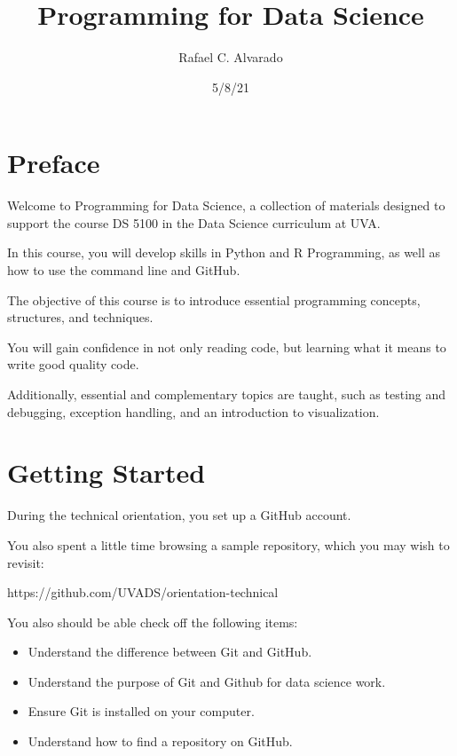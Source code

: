 \documentclass[
  letterpaper,
  DIV=11,
  numbers=noendperiod]{scrreport}
\title{Programming for Data Science}
\author{Rafael C. Alvarado}
\date{5/8/21}
\providecommand{\tightlist}{%
  \setlength{\itemsep}{0pt}\setlength{\parskip}{0pt}}\usepackage{longtable,booktabs,array}
\renewcommand*\contentsname{Table of contents}
\newcommand\contentsname{Table of contents}
\begin{document}
\maketitle
\ifdefined\Shaded\renewenvironment{Shaded}{\begin{tcolorbox}[borderline west={3pt}{0pt}{shadecolor}, sharp corners, frame hidden, enhanced, boxrule=0pt, interior hidden, breakable]}{\end{tcolorbox}}\fi

\renewcommand*\contentsname{Table of contents}
{
\hypersetup{linkcolor=}
\setcounter{tocdepth}{2}
\tableofcontents
}
\part{Preface}

Welcome to Programming for Data Science, a collection of materials
designed to support the course DS 5100 in the Data Science curriculum at
UVA.

In this course, you will develop skills in Python and R Programming, as
well as how to use the command line and GitHub.

The objective of this course is to introduce essential programming
concepts, structures, and techniques.

You will gain confidence in not only reading code, but learning what it
means to write good quality code.

Additionally, essential and complementary topics are taught, such as
testing and debugging, exception handling, and an introduction to
visualization.

\part{Getting Started}

During the technical orientation, you set up a GitHub account.

You also spent a little time browsing a sample repository, which you may
wish to revisit:

https://github.com/UVADS/orientation-technical

You also should be able check off the following items:

\begin{itemize}
\tightlist
\item
  Understand the difference between Git and GitHub.
\item
  Understand the purpose of Git and Github for data science work.
\item
  Ensure Git is installed on your computer.
\item
  Understand how to find a repository on GitHub.
\end{itemize}
\end{document}
